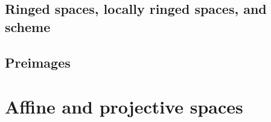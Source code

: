 


\subsection{Ringed spaces, locally ringed spaces, and scheme}























\subsection{Preimages}














\section{Affine and projective spaces}

